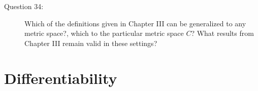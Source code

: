 \documentclass{article}
\begin{document}
\begin{description}

  \item[Question 34:] Which of the definitions given in Chapter III can be generalized to any metric space?, which to the particular metric space $C$? What results from Chapter III remain valid in these settings?

\end{description}



\newpage

\section{Differentiability}
\end{document}
